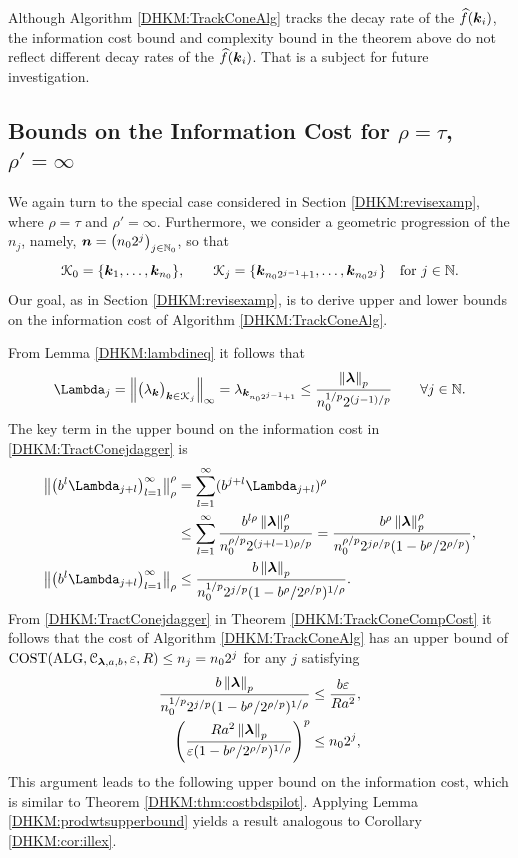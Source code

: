 \documentclass[USenglish]{article}
\theoremstyle{dgthm}
\theoremstyle{dgthm}
\theoremstyle{dgthm}
\theoremstyle{dgthm}
\theoremstyle{dgdef}
\theoremstyle{definition}
\DeclareMathOperator{\ALG}{ALG}
\DeclareMathOperator{\COST}{COST}
\newcommand{\hf}{\widehat{f}}
\newcommand{\norm}[2][{}]{\ensuremath{\left \lVert #2 \right \rVert}_{#1}}
\begin{document}
{Although Algorithm \ref{DHKM:TrackConeAlg} tracks the decay rate of the $\hf(\bsk_i)$, the information cost bound and complexity bound in the theorem above do not reflect different decay rates of the $\hf(\bsk_i)$. That is a subject for future investigation.  

\subsection{Bounds on the Information Cost for $\rho = \tau$, $\rho' = \infty$}\label{DHKM:SecDecayRhoEqTau}
We again turn to the special case considered in Section \ref{DHKM:revisexamp}, where $\rho = \tau$ and $\rho' = \infty$.  Furthermore, we consider a geometric progression of the $n_j$, namely, ${\boldsymbol{n}} = \bigl (n_02^j \bigr)_{j \in {\mathbb{N}}_0}$, so that
\[
{\mathcal{K}}_0 = \{{\boldsymbol{k}}_{1}, \ldots, {\boldsymbol{k}}_{n_0}\}, \qquad {\mathcal{K}}_j = \{{\boldsymbol{k}}_{n_0 2^{j-1}+1}, \ldots, {\boldsymbol{k}}_{n_02^j}\} \quad \text{for } j \in {\mathbb{N}}.
\]
Our goal, as in Section \ref{DHKM:revisexamp}, is to derive upper and lower bounds on the information cost of Algorithm \ref{DHKM:TrackConeAlg}.

From Lemma \ref{DHKM:lambdineq} it follows that 
\begin{equation*}
    \Lambda_j = \norm[\infty]{\bigl(\lambda_{\bsk} \bigr)_{\bsk \in \calK_j}} = \lambda_{\bsk_{n_02^{j-1}+1}}\le \frac{\norm[p]{\bslambda}}{n_0^{1/p} 2^{(j-1)/p}} \qquad \forall j \in \bbN.
\end{equation*}
The key term in the upper bound on the information cost in \eqref{DHKM:TractConejdagger} is
\begin{align*}
\norm[\rho]{ \bigl(b^{l}\Lambda_{j+l} \bigr)_{l=1}^\infty}^\rho
 & =  \sum_{l=1}^\infty
( b^{j+l}\Lambda_{j+l})^\rho \\
& \le \sum_{l=1}^\infty  
 \frac{b^{l\rho} \norm[p]{\bslambda}^\rho }{ n_0^{\rho/p} 2^{(j+l-1)\rho/p}} 
=  
 \frac{b^{\rho} \norm[p]{\bslambda}^\rho }{ n_0^{\rho/p} 2^{j\rho/p} (1 - b^{\rho}/2^{\rho/p})}, \\
\norm[\rho]{ \bigl(b^{l}\Lambda_{j+l} \bigr)_{l=1}^\infty}
 & \le  
 \frac{b \norm[p]{\bslambda} }{ n_0^{1/p} 2^{j/p} (1 - b^{\rho}/2^{\rho/p})^{1/\rho}}.
\end{align*}
From \eqref{DHKM:TractConejdagger} in Theorem \ref{DHKM:TrackConeCompCost} it follows that the cost of Algorithm \ref{DHKM:TrackConeAlg} has an upper bound of $\COST(\ALG,\calC_{\bslambda,a,b},\varepsilon,R) \le n_j = n_0 2^j$ for any $j$ satisfying 
\begin{align*}
    \frac{b \norm[p]{\bslambda} }{ n_0^{1/p} 2^{j/p} (1 - b^{\rho}/2^{\rho/p})^{1/\rho}} &\le \frac{b\varepsilon}{R a^2}, \\
   \left(\frac{ R a^{2} \norm[p]{\bslambda} }{\varepsilon (1 - b^{\rho}/2^{\rho/p})^{1/\rho}} \right)^p & \le n_0 2^{j},
\end{align*}
This argument leads to the following upper bound on the information cost, which is similar to Theorem \ref{DHKM:thm:costbdspilot}.  Applying Lemma \ref{DHKM:prodwtsupperbound} yields a result analogous to Corollary \ref{DHKM:cor:illex}.

}
\end{document}

